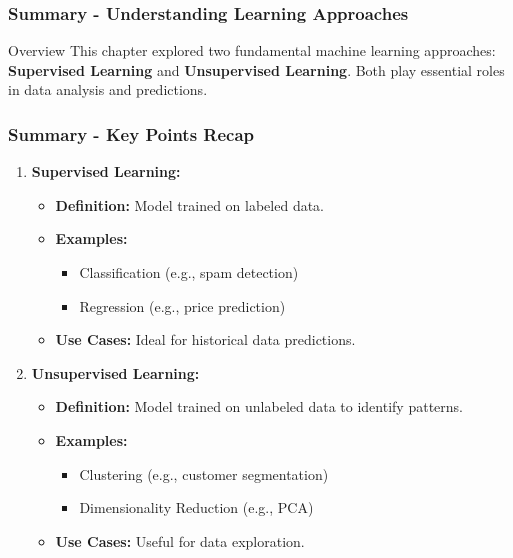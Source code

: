 \documentclass[aspectratio=169]{beamer}
\begin{document}
\begin{frame}[fragile]
  \frametitle{Summary - Understanding Learning Approaches}
  \begin{block}{Overview}
    This chapter explored two fundamental machine learning approaches: 
    \textbf{Supervised Learning} and \textbf{Unsupervised Learning}.
    Both play essential roles in data analysis and predictions.
  \end{block}
\end{frame}

\begin{frame}[fragile]
  \frametitle{Summary - Key Points Recap}
  \begin{enumerate}
    \item \textbf{Supervised Learning:}
    \begin{itemize}
      \item \textbf{Definition:} Model trained on labeled data.
      \item \textbf{Examples:} 
        \begin{itemize}
          \item Classification (e.g., spam detection)
          \item Regression (e.g., price prediction)
        \end{itemize}
      \item \textbf{Use Cases:} Ideal for historical data predictions.
    \end{itemize}
    
    \item \textbf{Unsupervised Learning:}
    \begin{itemize}
      \item \textbf{Definition:} Model trained on unlabeled data to identify patterns.
      \item \textbf{Examples:}
        \begin{itemize}
          \item Clustering (e.g., customer segmentation)
          \item Dimensionality Reduction (e.g., PCA)
        \end{itemize}
      \item \textbf{Use Cases:} Useful for data exploration.
    \end{itemize}
  \end{enumerate}
\end{frame}
\end{document}

